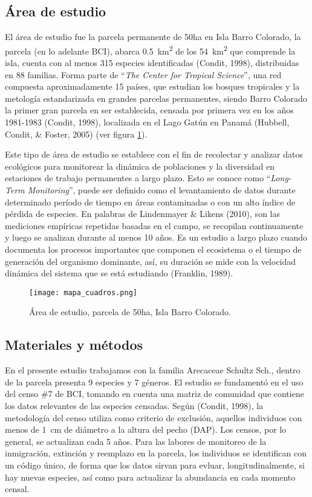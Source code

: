 \documentclass[11pt,]{article}
\begin{document}
\subsection{Área de estudio}\label{uxe1rea-de-estudio}

El área de estudio fue la parcela permanente de 50ha en Isla Barro
Colorado, la parcela (en lo adelante BCI), abarca
0.5~km\textsuperscript{2} de los 54~km\textsuperscript{2} que comprende
la isla, cuenta con al menos 315 especies identificadas (Condit, 1998),
distribuidas en 88 familias. Forma parte de ``\emph{The Center for
Tropical Science}'', una red compuesta aproximadamente 15 países, que
estudian los bosques tropicales y la metología estandarizada en grandes
parcelas permanentes, siendo Barro Colorado la primer gran parcela en
ser establecida, censada por primera vez en los años 1981-1983 (Condit,
1998), localizada en el Lago Gatún en Panamá (Hubbell, Condit, \&
Foster, 2005) (ver figura \ref{fig:mapa_cuadros}).

Este tipo de área de estudio se establece con el fin de recolectar y
analizar datos ecológicos para monitorear la dinámica de poblaciones y
la diversidad en estaciones de trabajo permanentes a largo plazo. Esto
se conoce como ``\emph{Long-Term Monitoring}'', puede ser definido como
el levantamiento de datos durante determinado período de tiempo en áreas
contaminadas o con un alto índice de pérdida de especies. En palabras de
Lindenmayer \& Likens (2010), son las mediciones empíricas repetidas
basadas en el campo, se recopilan continuamente y luego se analizan
durante al menos 10 años. Es un estudio a largo plazo cuando documenta
los procesos importantes que componen el ecosistema o el tiempo de
generación del organismo dominante, así, su duración se mide con la
velocidad dinámica del sistema que se está estudiando (Franklin, 1989).

\begin{figure}
\centering
\texttt{[image: mapa\_cuadros.png]}
\caption{Área de estudio, parcela de 50ha, Isla Barro Colorado.
\label{fig:mapa_cuadros}}
\end{figure}

\subsection{Materiales y métodos}\label{materiales-y-muxe9todos}

En el presente estudio trabajamos con la familia Arecaceae Schultz Sch.,
dentro de la parcela presenta 9 especies y 7 géneros. El estudio se
fundamentó en el uso del censo \#7 de BCI, tomando en cuenta una matriz
de comunidad que contiene los datos relevantes de las especies censadas.
Según (Condit, 1998), la metodología del censo utiliza como criterio de
exclusión, aquellos individuos con menos de 1~cm de diámetro a la altura
del pecho (DAP). Los censos, por lo general, se actualizan cada 5 años.
Para las labores de monitoreo de la inmigración, extinción y reemplazo
en la parcela, los individuos se identifican con un código único, de
forma que los datos sirvan para evluar, longitudinalmente, si hay nuevas
especies, así como para actualizar la abundancia en cada momento censal.
\end{document}
